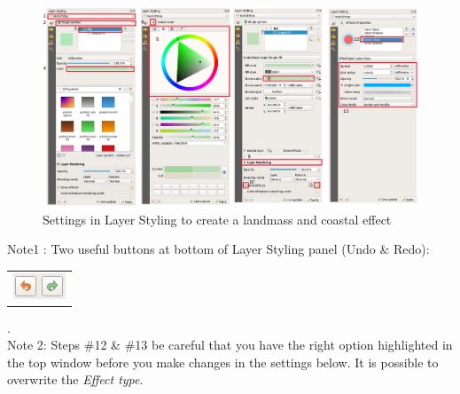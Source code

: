 \begin{figure}[!h]
	\centering
	\includegraphics[width=1\textwidth]{images/symb_land_and_sea.png}
	\caption{Settings in Layer Styling to create a landmass and coastal effect}
	\label{ft_fig_firstfig3}
\end{figure}


Note1 : Two useful buttons at bottom of Layer Styling panel (Undo \& Redo):            
\begin{tabular}{@{}c@{}}\includegraphics[width=4ex]{images/styling_redo_undo_icon.png}\end{tabular}.\\

Note 2: Steps \#12 \& \#13 be careful that you have the right option highlighted in the top window before you make changes in the settings below. It is possible to overwrite the \textit{Effect type}.\\


